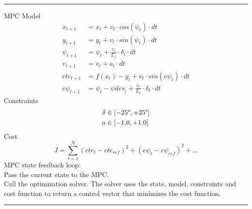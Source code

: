 \documentclass[12pt,draft]{report}
\begin{document}
\noindent\rule{\textwidth}{1pt}

MPC Model
\begin{align}
    x_{t+1} &= x_t + v_t \cdot cos(\psi_t) \cdot dt \\
    y_{t+1} &= y_t + v_t \cdot sin(\psi_t) \cdot dt \\
    \psi_{t+1} &= \psi_t + \frac{v_t}{L_f} \cdot \delta_t \cdot dt \\
    v_{t+1} &= v_t + a_t \cdot dt \\
    cte_{t+1} &= f(x_t) - y_t + v_t \cdot sin(e\psi_t) \cdot dt \\
    e\psi_{t+1} &= \psi_t - {\psi des}_t + \frac{v_t}{L_f} \cdot \delta_t \cdot dt
\end{align}
\-\hspace{0.5cm} Constraints
\begin{align}
    \delta &\in [-25\degree, +25\degree] \\
    a &\in [-1.0, +1.0]
\end{align}
\-\hspace{0.5cm} Cost
\begin{equation}
    J = \sum_{t=1}^N{(cte_t - cte_{ref})^2 + (e\psi_t - e\psi_{ref})^2 + ...}
\end{equation}
MPC state feedback loop: \\
Pass the current state to the MPC. \\
Call the optimization solver. The solver uses the state, model, constraints and cost function to return a control vector that minimizes the cost function.\\

\noindent\rule{\textwidth}{1pt}
\end{document}
